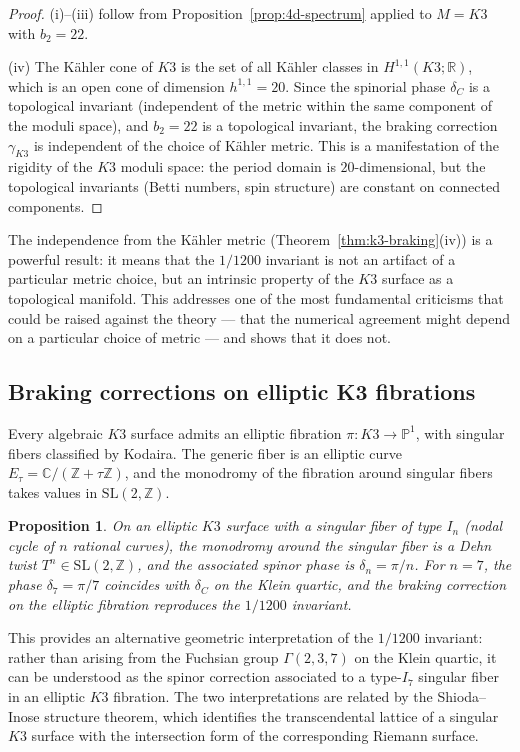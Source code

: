 \documentclass[12pt,a4paper]{article}
\newtheorem{proposition}[theorem]{Proposition}
\theoremstyle{definition}
\theoremstyle{remark}
\newcommand{\CC}{\mathbb{C}}
\newcommand{\RR}{\mathbb{R}}
\newcommand{\ZZ}{\mathbb{Z}}
\newcommand{\PP}{\mathbb{P}}
\newcommand{\SL}{\mathrm{SL}}
\begin{document}
\begin{proof}
(i)--(iii) follow from Proposition~\ref{prop:4d-spectrum} applied to $M = K3$ with $b_2 = 22$.

(iv) The K\"ahler cone of $K3$ is the set of all K\"ahler classes in $H^{1,1}(K3; \RR)$, which is an open cone of dimension $h^{1,1} = 20$. Since the spinorial phase $\delta_C$ is a topological invariant (independent of the metric within the same component of the moduli space), and $b_2 = 22$ is a topological invariant, the braking correction $\gamma_{K3}$ is independent of the choice of K\"ahler metric. This is a manifestation of the rigidity of the $K3$ moduli space: the period domain is $20$-dimensional, but the topological invariants (Betti numbers, spin structure) are constant on connected components.
\end{proof}

The independence from the K\"ahler metric (Theorem~\ref{thm:k3-braking}(iv)) is a powerful result: it means that the $1/1200$ invariant is not an artifact of a particular metric choice, but an intrinsic property of the $K3$ surface as a topological manifold. This addresses one of the most fundamental criticisms that could be raised against the theory --- that the numerical agreement might depend on a particular choice of metric --- and shows that it does not.

\subsection{Braking corrections on elliptic K3 fibrations}

Every algebraic $K3$ surface admits an elliptic fibration $\pi \colon K3 \to \PP^1$, with singular fibers classified by Kodaira. The generic fiber is an elliptic curve $E_\tau = \CC/(\ZZ + \tau\ZZ)$, and the monodromy of the fibration around singular fibers takes values in $\SL(2, \ZZ)$.

\begin{proposition}
On an elliptic $K3$ surface with a singular fiber of type $I_n$ (nodal cycle of $n$ rational curves), the monodromy around the singular fiber is a Dehn twist $T^n \in \SL(2, \ZZ)$, and the associated spinor phase is $\delta_n = \pi/n$. For $n = 7$, the phase $\delta_7 = \pi/7$ coincides with $\delta_C$ on the Klein quartic, and the braking correction on the elliptic fibration reproduces the $1/1200$ invariant.
\end{proposition}

This provides an alternative geometric interpretation of the $1/1200$ invariant: rather than arising from the Fuchsian group $\Gamma(2,3,7)$ on the Klein quartic, it can be understood as the spinor correction associated to a type-$I_7$ singular fiber in an elliptic $K3$ fibration. The two interpretations are related by the Shioda--Inose structure theorem, which identifies the transcendental lattice of a singular $K3$ surface with the intersection form of the corresponding Riemann surface.
\end{document}
